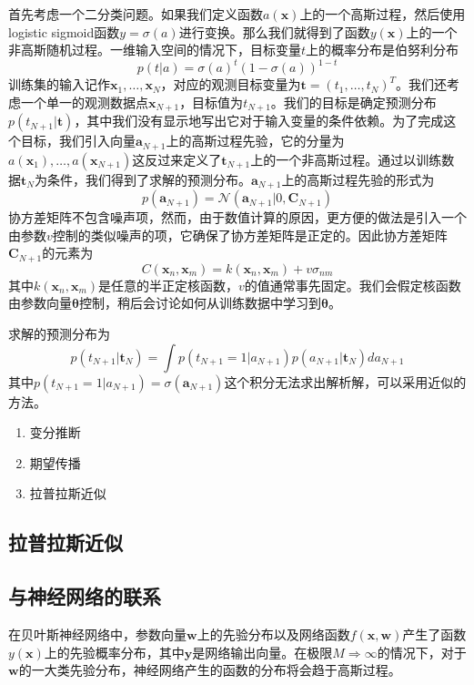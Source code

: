 首先考虑一个二分类问题。如果我们定义函数$a(\boldsymbol{x})$上的一个高斯过程，然后使用logistic sigmoid函数$y=\sigma(a)$进行变换。那么我们就得到了函数$y(\boldsymbol{x})$上的一个非高斯随机过程。一维输入空间的情况下，目标变量$t$上的概率分布是伯努利分布
\begin{equation}
	p(t|a)=\sigma(a)^t(1-\sigma(a))^{1-t}
\end{equation}
训练集的输入记作$\boldsymbol{x}_1,\dots,\boldsymbol{x}_N$，对应的观测目标变量为$\boldsymbol{t}=(t_1,\dots,t_N)^T$。我们还考虑一个单一的观测数据点$\boldsymbol{x}_{N+1}$，目标值为$t_{N+1}$。我们的目标是确定预测分布$p(t_{N+1}|\boldsymbol{t})$，其中我们没有显示地写出它对于输入变量的条件依赖。为了完成这个目标，我们引入向量$\boldsymbol{a}_{N+1}$上的高斯过程先验，它的分量为$a(\boldsymbol{x}_1),\dots,a(\boldsymbol{x}_{N+1})$这反过来定义了$\boldsymbol{t}_{N+1}$上的一个非高斯过程。通过以训练数据$\boldsymbol{t}_{N}$为条件，我们得到了求解的预测分布。$\boldsymbol{a}_{N+1}$上的高斯过程先验的形式为
\begin{equation}
	p(\boldsymbol{a}_{N+1})=\mathcal{N}(\boldsymbol{a}_{N+1}|0,\boldsymbol{C}_{N+1})
\end{equation}
协方差矩阵不包含噪声项，然而，由于数值计算的原因，更方便的做法是引入一个由参数$v$控制的类似噪声的项，它确保了协方差矩阵是正定的。因此协方差矩阵$\boldsymbol{C}_{N+1}$的元素为
\begin{equation}
	C(\boldsymbol{x}_n,\boldsymbol{x}_m)=k(\boldsymbol{x}_n,\boldsymbol{x}_m)+v\sigma_{nm}
\end{equation}
其中$k(\boldsymbol{x}_n,\boldsymbol{x}_m)$是任意的半正定核函数，$v$的值通常事先固定。我们会假定核函数由参数向量$\boldsymbol{\theta}$控制，稍后会讨论如何从训练数据中学习到$\boldsymbol{\theta}$。

求解的预测分布为
\begin{equation}
	p(t_{N+1}|\boldsymbol{t}_N)=\int p(t_{N+1}=1|a_{N+1})p(a_{N+1}|\boldsymbol{t}_{N})da_{N+1}
\end{equation}
其中$p(t_{N+1}=1|a_{N+1})=\sigma(\boldsymbol{a}_{N+1})$这个积分无法求出解析解，可以采用近似的方法。
\begin{enumerate}
	\item 变分推断
	\item 期望传播
	\item 拉普拉斯近似
\end{enumerate}
\subsection*{拉普拉斯近似}
\subsection*{与神经网络的联系}
在贝叶斯神经网络中，参数向量$\boldsymbol{w}$上的先验分布以及网络函数$f(\boldsymbol{x},\boldsymbol{w})$产生了函数$y(\boldsymbol{x})$上的先验概率分布，其中$\boldsymbol{y}$是网络输出向量。在极限$M\Rightarrow \infty$的情况下，对于$\boldsymbol{w}$的一大类先验分布，神经网络产生的函数的分布将会趋于高斯过程。